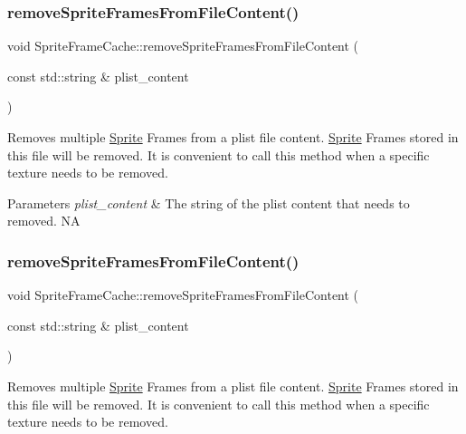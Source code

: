 \subsubsection{\texorpdfstring{remove\+Sprite\+Frames\+From\+File\+Content()}{removeSpriteFramesFromFileContent()}\hspace{0.1cm}{\footnotesize\ttfamily [1/2]}}
{\footnotesize\ttfamily void Sprite\+Frame\+Cache\+::remove\+Sprite\+Frames\+From\+File\+Content (\begin{DoxyParamCaption}\item[{const std\+::string \&}]{plist\+\_\+content }\end{DoxyParamCaption})}

Removes multiple \hyperlink{classSprite}{Sprite} Frames from a plist file content. \hyperlink{classSprite}{Sprite} Frames stored in this file will be removed. It is convenient to call this method when a specific texture needs to be removed.


\begin{DoxyParams}{Parameters}
{\em plist\+\_\+content} & The string of the plist content that needs to removed.  NA \\
\hline
\end{DoxyParams}
\mbox{\label{classSpriteFrameCache_afbc12b894257ad87d0e638b9ce7decab}} 
\subsubsection{\texorpdfstring{remove\+Sprite\+Frames\+From\+File\+Content()}{removeSpriteFramesFromFileContent()}\hspace{0.1cm}{\footnotesize\ttfamily [2/2]}}
{\footnotesize\ttfamily void Sprite\+Frame\+Cache\+::remove\+Sprite\+Frames\+From\+File\+Content (\begin{DoxyParamCaption}\item[{const std\+::string \&}]{plist\+\_\+content }\end{DoxyParamCaption})}

Removes multiple \hyperlink{classSprite}{Sprite} Frames from a plist file content. \hyperlink{classSprite}{Sprite} Frames stored in this file will be removed. It is convenient to call this method when a specific texture needs to be removed.



